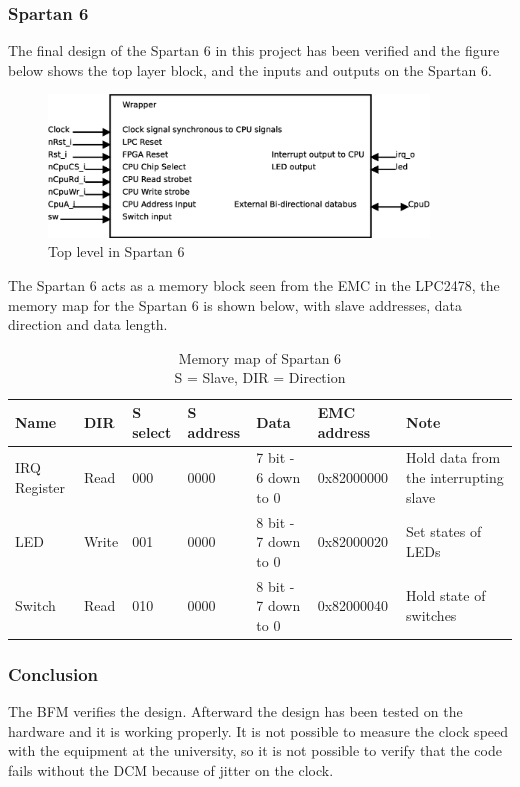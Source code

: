 \subsubsection{Spartan 6}
The final design of the Spartan 6 in this project has been verified and the figure below shows the top layer block, and the inputs and outputs on the Spartan 6.
\begin{figure}[H]
	\begin{centering}
		\includegraphics[width=0.9\textwidth]{images/tb7_wrapperblock.eps}
		\caption{Top level in Spartan 6}
	\end{centering}
\end{figure}
The Spartan 6 acts as a memory block seen from the EMC in the LPC2478, the memory map for the Spartan 6 is shown below, with slave addresses, data direction and data length.
\begin{table}[H]
    \begin{tabular}{|l|l|l|l|l|l|p{3.7cm}|}
        \hline
        Name         & DIR		 & S select 	& S address 	& Data                & EMC address & Note                                  \\ \hline
        IRQ Register & Read      & 000          & 0000          & 7 bit - 6 down to 0 & 0x82000000        & Hold data from the interrupting slave \\ \hline
        LED          & Write     & 001          & 0000          & 8 bit - 7 down to 0 & 0x82000020        & Set states of LEDs                    \\ \hline
        Switch       & Read      & 010          & 0000          & 8 bit - 7 down to 0 & 0x82000040        & Hold state of switches                \\
        \hline
    \end{tabular}
    \caption{Memory map of Spartan 6\\
    		 S = Slave, DIR = Direction}
\end{table}
\subsubsection{Conclusion}
The BFM verifies the design. Afterward the design has been tested on the hardware and it is working properly. It is not possible to measure the clock speed with the equipment at the university, so it is not possible to verify that the code fails without the DCM because of jitter on the clock.
